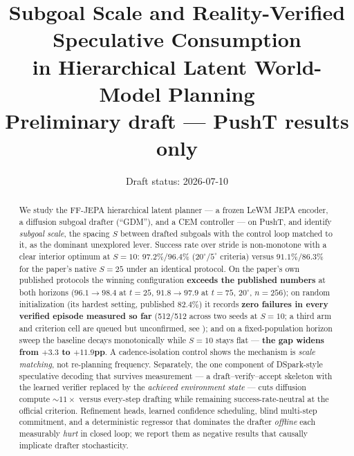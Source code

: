 \documentclass[11pt]{article}
\title{Subgoal Scale and Reality-Verified Speculative Consumption\\
in Hierarchical Latent World-Model Planning\\
\large Preliminary draft --- PushT results only}
\author{}
\date{Draft status: 2026-07-10}
\newcommand{\ours}[1]{\textbf{#1}}          %
\newcommand{\degc}[1]{$#1^\circ$}
\begin{document}
\maketitle

\begin{center}
\end{center}

\begin{abstract}
We study the FF-JEPA hierarchical latent planner --- a frozen LeWM JEPA encoder, a
diffusion subgoal drafter (``GDM''), and a CEM controller --- on PushT, and identify
\emph{subgoal scale}, the spacing $S$ between drafted subgoals with the control loop
matched to it, as the dominant unexplored lever. Success rate over stride is
non-monotone with a clear interior optimum at $S{=}10$: \ours{$97.2\%/96.4\%$}
(\degc{20}/\degc{5} criteria) versus $91.1\%/86.3\%$ for the paper's native $S{=}25$
under an identical protocol. On the paper's own published protocols the winning
configuration \ours{exceeds the published numbers} at both horizons ($96.1{\to}98.4$
at $t{=}25$, $91.8{\to}97.9$ at $t{=}75$, \degc{20}, $n{=}256$); on random
initialization (its hardest setting, published $82.4\%$) it records \ours{zero
failures in every verified episode measured so far} (512/512 across two seeds at
$S{=}10$; a third arm and criterion cell are queued but unconfirmed, see
); and on a fixed-population horizon sweep
the baseline decays monotonically while $S{=}10$ stays flat --- \ours{the gap widens
from $+3.3$ to $+11.9$pp}. A cadence-isolation control shows the mechanism is
\emph{scale matching}, not re-planning frequency. Separately, the one component of
DSpark-style speculative decoding that survives measurement --- a draft--verify--accept
skeleton with the learned verifier replaced by the \emph{achieved environment state}
--- cuts diffusion compute ${\sim}11\times$ versus every-step drafting while remaining
success-rate-neutral at the official criterion. Refinement heads, learned confidence
scheduling, blind multi-step commitment, and a deterministic regressor that dominates
the drafter \emph{offline} each measurably \emph{hurt} in closed loop; we report them
as negative results that causally implicate drafter stochasticity.
\end{abstract}
\end{document}
